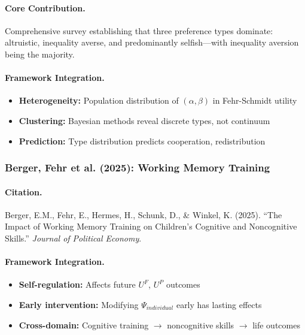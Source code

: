 \documentclass[12pt,a4paper]{article}
\begin{document}
\paragraph{Core Contribution.}
Comprehensive survey establishing that three preference types dominate:
altruistic, inequality averse, and predominantly selfish---with inequality
aversion being the majority.

\paragraph{Framework Integration.}
\begin{itemize}
  \item \textbf{Heterogeneity:} Population distribution of $(\alpha, \beta)$ 
        in Fehr-Schmidt utility
  \item \textbf{Clustering:} Bayesian methods reveal discrete types, not continuum
  \item \textbf{Prediction:} Type distribution predicts cooperation, redistribution
\end{itemize}

\subsubsection{Berger, Fehr et al. (2025): Working Memory Training}

\paragraph{Citation.}
Berger, E.M., Fehr, E., Hermes, H., Schunk, D., \& Winkel, K. (2025).
``The Impact of Working Memory Training on Children's Cognitive and Noncognitive Skills.''
\emph{Journal of Political Economy}.

\paragraph{Framework Integration.}
\begin{itemize}
  \item \textbf{Self-regulation:} Affects future $U^F$, $U^P$ outcomes
  \item \textbf{Early intervention:} Modifying $\Psi_{individual}$ early has lasting effects
  \item \textbf{Cross-domain:} Cognitive training $\to$ noncognitive skills $\to$ life outcomes
\end{itemize}

\end{document}
